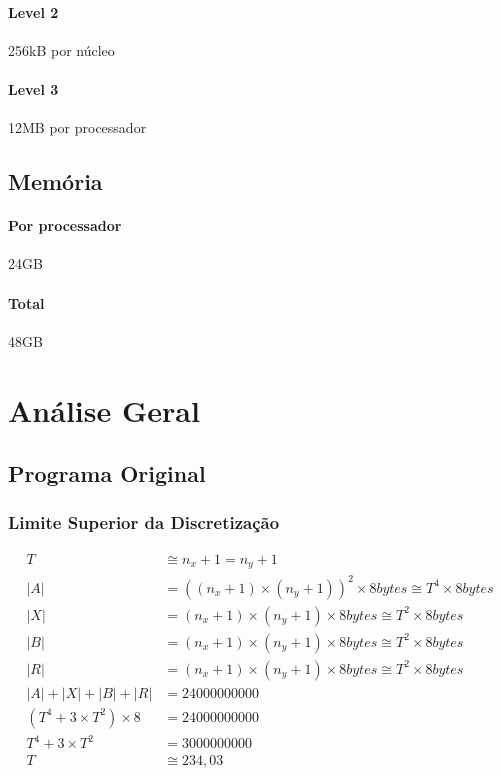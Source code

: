 \documentclass[12pt]{article}
\begin{document}
\paragraph{Level 2} 256kB por núcleo
\paragraph{Level 3} 12MB por processador

\subsection{Memória}
\paragraph{Por processador} 24GB
\paragraph{Total} 48GB

\newpage


\newpage

\section{Análise Geral}

	\subsection{Programa Original}
	\subsubsection{Limite Superior da Discretização}

	\begin{align}
		T &\cong n_x + 1 = n_y + 1 \\
		|A| &= ((n_x+1)\times(n_y+1))^2\times8 bytes \cong T^4\times8 bytes \\
		|X| &= (n_x+1)\times(n_y+1)\times8 bytes \cong T^2\times8 bytes \\
		|B| &= (n_x+1)\times(n_y+1)\times8 bytes \cong T^2\times8 bytes \\
		|R| &= (n_x+1)\times(n_y+1)\times8 bytes \cong T^2\times8 bytes \\
		|A| + |X| + |B| + |R| &= 24000000000 \\
		(T^4 + 3\times T^2)\times8 &= 24000000000 \\
		T^4 + 3\times T^2 &= 3000000000 \\
		T &\cong 234,03
	\end{align}
\end{document}
